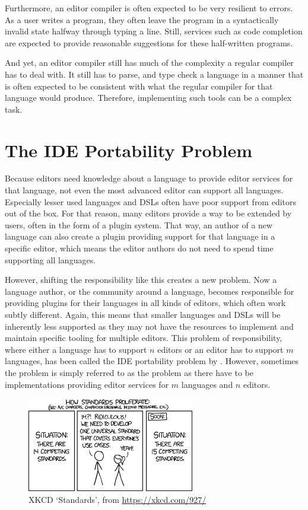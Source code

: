 Furthermore, an editor compiler is often expected to be very resilient to errors.
As a user writes a program, they often leave the program in a syntactically invalid state halfway through typing a line.
Still, services such as code completion are expected to provide reasonable suggestions for these half-written programs.

And yet, an editor compiler still has much of the complexity a regular compiler has to deal with.
It still has to parse, and type check a language in a manner that is often expected to be consistent with what the regular compiler for that language would produce.
Therefore, implementing such tools can be a complex task.

\section{The \acs{IDE} Portability Problem}\label{sec:ide-portability-problem}

Because editors need knowledge about a language to provide editor services for that language, not even the most advanced editor can support all languages.
Especially lesser used languages and \acp{DSL} often have poor support from editors out of the box.
For that reason, many editors provide a way to be extended by users, often in the form of a plugin system.
That way, an author of a new language can also create a plugin providing support for that language in a specific editor,
which means the editor authors do not need to spend time supporting all languages.

However, shifting the responsibility like this creates a new problem.
Now a language author, or the community around a language, becomes responsible for providing plugins for their languages in all kinds of editors, which often work subtly different.
Again, this means that smaller languages and \acp{DSL} will be inherently less supported as they may not have the resources to implement and maintain specific tooling for multiple editors.
This problem of responsibility, where either a language has to support $n$ editors or an editor has to support $m$ languages, has been called the \ac{IDE} portability problem by \textcite{KeidelPE16}.
However, sometimes the problem is simply referred to as the \problem{\times} problem as there have to be \problem{\times} implementations providing editor services for $m$ languages and $n$ editors.

\begin{figure}
    \centering
    \includegraphics[width=0.65\textwidth]{../images/standards}
    \caption{XKCD `Standards', from \url{https://xkcd.com/927/}}
    \label{fig:standards}
\end{figure}

